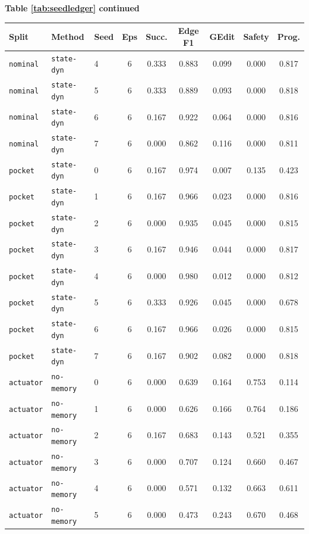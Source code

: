 \documentclass{article}
\begin{document}
\begin{center}
\textbf{Table \ref{tab:seedledger} continued}\\[0.4ex]
\begin{tabular}{lllcccccc}
\toprule
Split & Method & Seed & Eps & Succ. & Edge F1 & GEdit & Safety & Prog. \\
\midrule
\texttt{nominal} & \texttt{state-dyn} & 4 & 6 & 0.333 & 0.883 & 0.099 & 0.000 & 0.817 \\
\texttt{nominal} & \texttt{state-dyn} & 5 & 6 & 0.333 & 0.889 & 0.093 & 0.000 & 0.818 \\
\texttt{nominal} & \texttt{state-dyn} & 6 & 6 & 0.167 & 0.922 & 0.064 & 0.000 & 0.816 \\
\texttt{nominal} & \texttt{state-dyn} & 7 & 6 & 0.000 & 0.862 & 0.116 & 0.000 & 0.811 \\
\texttt{pocket} & \texttt{state-dyn} & 0 & 6 & 0.167 & 0.974 & 0.007 & 0.135 & 0.423 \\
\texttt{pocket} & \texttt{state-dyn} & 1 & 6 & 0.167 & 0.966 & 0.023 & 0.000 & 0.816 \\
\texttt{pocket} & \texttt{state-dyn} & 2 & 6 & 0.000 & 0.935 & 0.045 & 0.000 & 0.815 \\
\texttt{pocket} & \texttt{state-dyn} & 3 & 6 & 0.167 & 0.946 & 0.044 & 0.000 & 0.817 \\
\texttt{pocket} & \texttt{state-dyn} & 4 & 6 & 0.000 & 0.980 & 0.012 & 0.000 & 0.812 \\
\texttt{pocket} & \texttt{state-dyn} & 5 & 6 & 0.333 & 0.926 & 0.045 & 0.000 & 0.678 \\
\texttt{pocket} & \texttt{state-dyn} & 6 & 6 & 0.167 & 0.966 & 0.026 & 0.000 & 0.815 \\
\texttt{pocket} & \texttt{state-dyn} & 7 & 6 & 0.167 & 0.902 & 0.082 & 0.000 & 0.818 \\
\texttt{actuator} & \texttt{no-memory} & 0 & 6 & 0.000 & 0.639 & 0.164 & 0.753 & 0.114 \\
\texttt{actuator} & \texttt{no-memory} & 1 & 6 & 0.000 & 0.626 & 0.166 & 0.764 & 0.186 \\
\texttt{actuator} & \texttt{no-memory} & 2 & 6 & 0.167 & 0.683 & 0.143 & 0.521 & 0.355 \\
\texttt{actuator} & \texttt{no-memory} & 3 & 6 & 0.000 & 0.707 & 0.124 & 0.660 & 0.467 \\
\texttt{actuator} & \texttt{no-memory} & 4 & 6 & 0.000 & 0.571 & 0.132 & 0.663 & 0.611 \\
\texttt{actuator} & \texttt{no-memory} & 5 & 6 & 0.000 & 0.473 & 0.243 & 0.670 & 0.468 \\

\end{tabular}
\end{center}
\end{document}
